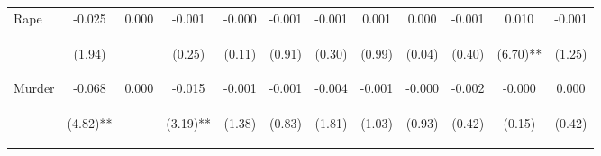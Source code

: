 \begin{tabular}{lccccccccccc}
\noalign{\smallskip}Rape & -0.025 & 0.000 & -0.001 & -0.000 & -0.001 & -0.001 & 0.001 & 0.000 & -0.001 & 0.010 & -0.001\\
 & \begin{footnotesize}(1.94)\end{footnotesize} & \begin{footnotesize}\end{footnotesize} & \begin{footnotesize}(0.25)\end{footnotesize} & \begin{footnotesize}(0.11)\end{footnotesize} & \begin{footnotesize}(0.91)\end{footnotesize} & \begin{footnotesize}(0.30)\end{footnotesize} & \begin{footnotesize}(0.99)\end{footnotesize} & \begin{footnotesize}(0.04)\end{footnotesize} & \begin{footnotesize}(0.40)\end{footnotesize} & \begin{footnotesize}(6.70)**\end{footnotesize} & \begin{footnotesize}(1.25)\end{footnotesize}\\
\noalign{\smallskip}Murder & -0.068 & 0.000 & -0.015 & -0.001 & -0.001 & -0.004 & -0.001 & -0.000 & -0.002 & -0.000 & 0.000\\
 & \begin{footnotesize}(4.82)**\end{footnotesize} & \begin{footnotesize}\end{footnotesize} & \begin{footnotesize}(3.19)**\end{footnotesize} & \begin{footnotesize}(1.38)\end{footnotesize} & \begin{footnotesize}(0.83)\end{footnotesize} & \begin{footnotesize}(1.81)\end{footnotesize} & \begin{footnotesize}(1.03)\end{footnotesize} & \begin{footnotesize}(0.93)\end{footnotesize} & \begin{footnotesize}(0.42)\end{footnotesize} & \begin{footnotesize}(0.15)\end{footnotesize} & \begin{footnotesize}(0.42)\end{footnotesize}\\

\end{tabular}
